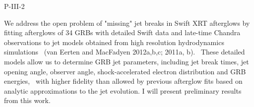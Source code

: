 P-III-2


\bigskip



\bigskip

\noindent We address the open problem of "missing" jet breaks in Swift XRT afterglows by fitting afterglows of 34 GRBs with detailed Swift data and late-time Chandra observations to jet models obtained from high resolution hydrodynamics simulations  (van Eerten and MacFadyen 2012a,b,c; 2011a, b).  These detailed models allow us to determine GRB jet parameters, including jet break times, jet opening angle, observer angle, shock-accelerated electron distribution and GRB energies,  with higher fidelity than allowed by previous afterglow fits based on analytic approximations to the jet evolution.  I will present preliminary results from this work.

